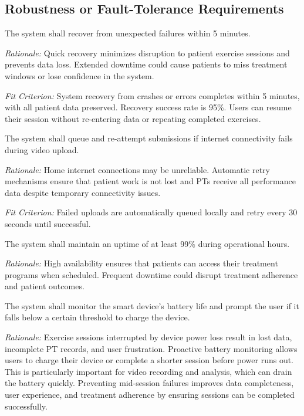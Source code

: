 \documentclass[12pt]{article}
\newcommand{\rationale}[1]{\par\emph{Rationale:} #1}
\newcommand{\fitcrit}[1]{\par\emph{Fit Criterion:} #1}
\begin{document}
\subsection{Robustness or Fault-Tolerance Requirements}
\begin{reqlist}
	\item[PR-RFT 1.] The system shall recover from unexpected failures within 5 minutes.
	\rationale{Quick recovery minimizes disruption to patient exercise sessions and prevents data loss. Extended downtime could cause patients to miss treatment windows or lose confidence in the system.}
	\fitcrit{System recovery from crashes or errors completes within 5 minutes, with all patient data preserved. Recovery success rate is 95\%. Users can resume their session without re-entering data or repeating completed exercises.}
	
	\item[PR-RFT 2.] The system shall queue and re-attempt submissions if internet connectivity fails during video upload.
	\rationale{Home internet connections may be unreliable. Automatic retry mechanisms ensure that patient work is not lost and PTs receive all performance data despite temporary connectivity issues.}
	\fitcrit{Failed uploads are automatically queued locally and retry every 30 seconds until successful.}
	
	\item[PR-RFT 3.] The system shall maintain an uptime of at least 99\% during operational hours.
	\rationale{High availability ensures that patients can access their treatment programs when scheduled. Frequent downtime could disrupt treatment adherence and patient outcomes.}
	
	\item[PR-RFT 4.] The system shall monitor the smart device's battery life and prompt the user if it falls below a certain threshold to charge the device.
	\rationale{Exercise sessions interrupted by device power loss result in lost data, incomplete PT records, and user frustration. Proactive battery monitoring allows users to charge their device or complete a shorter session before power runs out. This is particularly important for video recording and analysis, which can drain the battery quickly. Preventing mid-session failures improves data completeness, user experience, and treatment adherence by ensuring sessions can be completed successfully.}
\end{reqlist}
\end{document}
